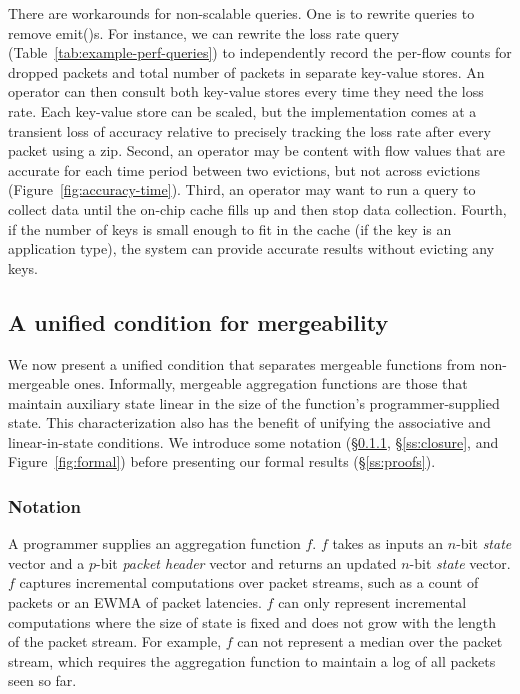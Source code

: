 There are workarounds for non-scalable queries. One is to rewrite queries to
remove {\ct emit()}s.  For instance, we can rewrite the loss rate query
(Table~\ref{tab:example-perf-queries}) to independently record the per-flow
counts for dropped packets and total number of packets in separate key-value
stores. An operator can then consult both key-value stores every time they need
the loss rate. Each key-value store can be scaled, but the implementation comes
at a transient loss of accuracy relative to precisely tracking the loss rate
after every packet using a {\ct zip.} Second, an operator may be content with
flow values that are accurate for each time period between two evictions, but
not across evictions (Figure~\ref{fig:accuracy-time}). Third, an operator may
want to run a query to collect data until the on-chip cache fills up and then
stop data collection.  Fourth, if the number of keys is small enough to fit in
the cache (\eg if the key is an application type), the system can provide
accurate results without evicting any keys.

\subsection{A unified condition for mergeability}
\label{sec:unifies}
We now present a unified condition that separates mergeable functions from
non-mergeable ones.  Informally, mergeable aggregation functions are those that
maintain auxiliary state linear in the size of the function's
programmer-supplied state. This characterization also has the benefit of
unifying the associative and linear-in-state conditions.  We introduce some
notation (\S\ref{ss:notation}, \S\ref{ss:closure}, and
Figure~\ref{fig:formal}) before presenting our formal results
(\S\ref{ss:proofs}).

\subsubsection{Notation}
\label{ss:notation}

A programmer supplies an aggregation function $f$. $f$ takes as inputs an
$n$-bit \emph{state} vector and a $p$-bit \emph{packet header} vector and
returns an updated $n$-bit \emph{state} vector. $f$ captures incremental
computations over packet streams, such as a count of packets or an EWMA of
packet latencies. $f$ can only represent incremental computations where the
size of state is fixed and does not grow with the length of the packet stream.
For example, $f$ can not represent a median over the packet stream, which
requires the aggregation function to maintain a log of all packets seen so far.

